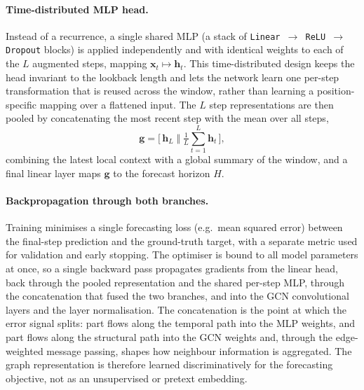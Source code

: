 \paragraph{Time-distributed MLP head.}
Instead of a recurrence, a single shared MLP (a stack of
\texttt{Linear $\to$ ReLU $\to$ Dropout} blocks) is applied independently and
with identical weights to each of the $L$ augmented steps, mapping
$\mathbf{x}_t \mapsto \mathbf{h}_t$. This time-distributed design keeps the
head invariant to the lookback length and lets the network learn one per-step
transformation that is reused across the window, rather than learning a
position-specific mapping over a flattened input. The $L$ step
representations are then pooled by concatenating the most recent step with the
mean over all steps,
\[
\mathbf{g} = \big[\, \mathbf{h}_L \;\Vert\; \tfrac{1}{L}\textstyle\sum_{t=1}^{L}\mathbf{h}_t \,\big],
\]
combining the latest local context with a global summary of the window, and a
final linear layer maps $\mathbf{g}$ to the forecast horizon $H$.

\paragraph{Backpropagation through both branches.}
Training minimises a single forecasting loss (e.g.\ mean squared error) between
the final-step prediction and the ground-truth target, with a separate metric
used for validation and early stopping. The optimiser is bound to all model
parameters at once, so a single backward pass propagates gradients from the
linear head, back through the pooled representation and the shared per-step MLP,
through the concatenation that fused the two branches, and into the GCN
convolutional layers and the layer normalisation. The concatenation is the
point at which the error signal splits: part flows along the temporal path into
the MLP weights, and part flows along the structural path into the GCN weights
and, through the edge-weighted message passing, shapes how neighbour
information is aggregated. The graph representation is therefore learned
discriminatively for the forecasting objective, not as an unsupervised or
pretext embedding.


